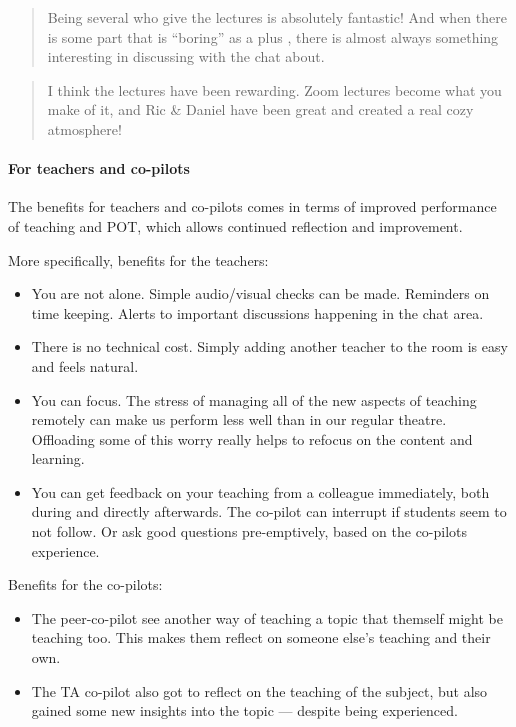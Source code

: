 \documentclass{article}
\begin{document}
\begin{quote}
Being several who give the lectures is absolutely fantastic! And when there
is some part that is \enquote{boring} as a plus , there is almost always something
interesting in discussing with the chat about.
\end{quote}

\begin{quote}
I think the lectures have been rewarding. Zoom lectures become what you
make of it, and Ric \& Daniel have been great and created a real cozy
atmosphere!
\end{quote}

\paragraph{For teachers and co-pilots}

The benefits for teachers and co-pilots comes in terms of improved performance 
of teaching and \ac{POT}, which allows continued reflection and improvement.

More specifically, benefits for the teachers:

\begin{itemize}
  \item You are not alone. Simple audio/visual checks can be made. Reminders on 
    time keeping. Alerts to important discussions happening in the chat area.

  \item There is no technical cost. Simply adding another teacher to the room 
    is easy and feels natural.

  \item You can focus. The stress of managing all of the new aspects of 
    teaching remotely can make us perform less well than in our regular 
    theatre. Offloading some of this worry really helps to refocus on the 
    content and learning.

  \item You can get feedback on your teaching from a colleague immediately, 
    both during and directly afterwards.
    The co-pilot can interrupt if students seem to not follow.
    Or ask good questions pre-emptively, based on the co-pilots experience.
\end{itemize}

Benefits for the co-pilots:

\begin{itemize}
  \item The peer-co-pilot see another way of teaching a topic that themself 
    might be teaching too.
    This makes them reflect on someone else's teaching and their own.

  \item The TA co-pilot also got to reflect on the teaching of the subject, but 
    also gained some new insights into the topic --- despite being experienced.
\end{itemize}
\end{document}

